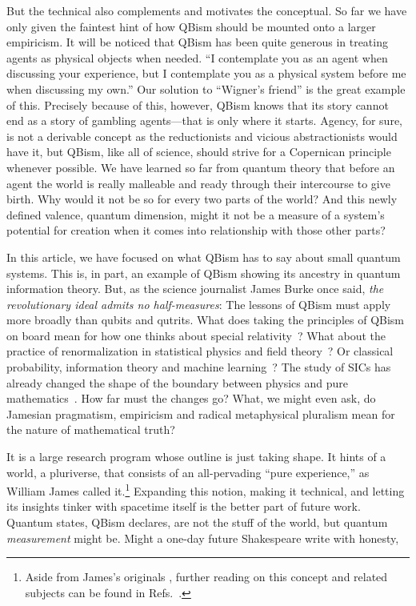 \documentclass[aps,pra,superscriptaddress,12pt,tightenlines,nofootinbib]{revtex4-2}
\begin{document}
But the technical also complements and motivates the conceptual.  So far we have only given the faintest hint of how QBism should be mounted onto a larger empiricism.  It will be noticed that QBism has been quite generous in treating agents as physical objects when needed.  ``I contemplate you as an agent when discussing your experience, but I contemplate you as a physical system before me when discussing my own.''  Our solution to ``Wigner's friend'' is the great example of this.  Precisely because of this, however, QBism knows that its story cannot end as a story of gambling agents---that is only where it starts.  Agency, for sure, is not a derivable concept as the reductionists and vicious abstractionists would have it, but QBism, like all of science, should strive for a Copernican principle whenever possible.  We have learned so far from quantum theory that before an agent the world is really malleable and ready through their intercourse to give birth.  Why would it not be so for every two parts of the world?  And this newly defined valence, quantum dimension, might it not be a measure of a system's potential for creation when it comes into relationship with those other parts?

In this article, we have focused on what QBism has to say about small quantum systems.  This is, in part, an example of QBism showing its ancestry in quantum information theory.  But, as the science journalist James Burke once said, {\it the revolutionary ideal admits no half-measures}:  The lessons of QBism must apply more broadly than qubits and qutrits.  What does taking the principles of QBism on board mean for how one thinks about special relativity~\cite{Mermin13}?  What about the practice of renormalization in statistical physics and field theory~\cite{DeBrota16}?  Or classical probability, information theory and machine learning~\cite{Fuchs11, stacey-thesis}?  The study of SICs has already changed the shape of the boundary between physics and pure mathematics~\cite{stacey-hoggar, RCF-SIC, Bengtsson16}.  How far must the changes go?  What, we might even ask, do Jamesian pragmatism, empiricism and radical metaphysical pluralism mean for the nature of mathematical truth?

It is a large research program whose outline is just taking shape.  It hints of a world, a pluriverse, that consists of an all-pervading ``pure experience,'' as William James called it.\footnote{Aside from James's originals \cite{James96a,James96b}, further reading on this concept and related subjects can be found in Refs.~\cite{Lamberth99,Taylor96,Wild69,Gieser05,Russell08,Banks03,Heidelberger04}.}  Expanding this notion, making it technical, and letting its insights tinker with spacetime itself is the better part of future work.  Quantum states, QBism declares, are not the stuff of the world, but quantum {\it measurement\/} might be.  Might a one-day future Shakespeare write with honesty,
\end{document}
